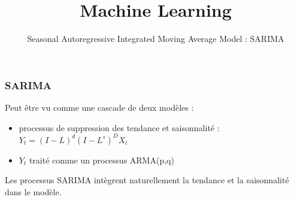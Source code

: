 \documentclass{formation}
\title{Machine Learning}
\subtitle{Seasonal Autoregressive Integrated Moving Average Model : SARIMA}
\begin{document}
\maketitle

\begin{frame}
  \frametitle{SARIMA}
  Peut être vu comme une cascade de deux modèles :
  \begin{itemize}
  \item processus de suppression des tendance et saisonnalité : $Y_t=(I-L)^d(I-L^s)^DX_t$
  \item $Y_t$ traité comme un processus ARMA(p,q)
  \end{itemize}
  Les processus SARIMA intègrent naturellement la tendance et la saisonnalité dans le modèle.
\end{frame}
\end{document}
